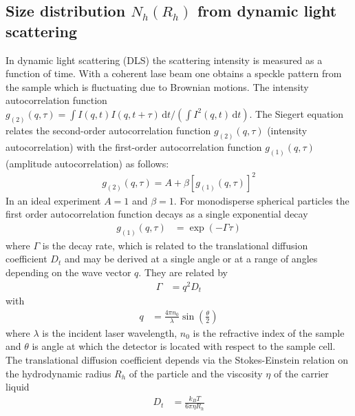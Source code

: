 \subsection{Size distribution $N_h(R_h)$ from dynamic light scattering}
\label{sec:DLS}
In dynamic light scattering (DLS) the scattering intensity is measured as a function of time. With a coherent lase beam one obtains a speckle pattern from the sample which is fluctuating due to Brownian motions. The intensity autocorrelation function $g_{(2)}(q,\tau)=\int  I(q,t) I(q,t+\tau)\,\mathrm{d}t/\left(\int  I^2(q,t)\,\mathrm{d}t\right)$. The Siegert equation relates the second-order autocorrelation function $g_{(2)}(q,\tau)$ (intensity autocorrelation) with the first-order autocorrelation function $g_{(1)}(q,\tau)$ (amplitude autocorrelation) as follows:
\begin{align}
    \label{eq:siegert}
    g_{(2)}(q,\tau)= A+\beta\left[g_{(1)}(q,\tau)\right]^2
\end{align}
In an ideal experiment $A=1$ and $\beta=1$. For monodisperse spherical particles the first order autocorrelation function decays as a single exponential decay
\begin{align}
    g_{(1)}(q,\tau) &= \exp\left(-\Gamma\tau\right)
\end{align}
where $\Gamma$ is the decay rate, which is related to the translational diffusion coefficient $D_t$ and may be derived at a single angle or at a range of angles depending on the wave vector $q$. They are related by
\begin{align}\label{eq:GammaDq2}
\Gamma &=q^2D_t
\end{align}
with
\begin{align}
\label{eq:q}
 q &= \frac{4\pi n_0}{\lambda}\sin\left(\frac{\theta}{2}\right)
\end{align}
where $\lambda$ is the incident laser wavelength, $n_0$ is the refractive index of the sample and $\theta$ is angle at which the detector is located with respect to the sample cell. The translational diffusion coefficient depends via the Stokes-Einstein relation on the hydrodynamic radius $R_h$ of the particle and the viscosity $\eta$ of the carrier liquid
\begin{align}
\label{eq:D_t}
D_t &= \frac{k_BT}{6\pi\eta R_h}
\end{align}

